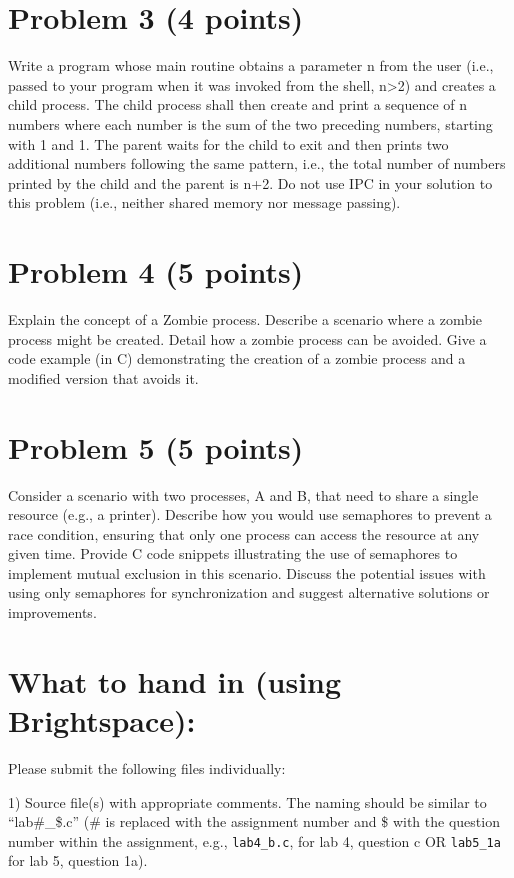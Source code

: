 \documentclass{article}
\begin{document}
\section*{Problem 3 (4 points)}

Write a program whose main routine obtains a parameter n from the user (i.e., passed to your program when it was invoked from the shell, n>2) and creates a child process. The child process shall then create and print a sequence of n numbers where each number is the sum of the two preceding numbers, starting with 1 and 1. The parent waits for the child to exit and then prints two additional numbers following the same pattern, i.e., the total number of numbers printed by the child and the parent is n+2. Do not use IPC in your solution to this problem (i.e., neither shared memory nor message passing).


\section*{Problem 4 (5 points)}

Explain the concept of a Zombie process. Describe a scenario where a zombie process might be created.  Detail how a zombie process can be avoided.  Give a code example (in C) demonstrating the creation of a zombie process and a modified version that avoids it.


\section*{Problem 5 (5 points)}

Consider a scenario with two processes, A and B, that need to share a single resource (e.g., a printer).  Describe how you would use semaphores to prevent a race condition, ensuring that only one process can access the resource at any given time. Provide C code snippets illustrating the use of semaphores to implement mutual exclusion in this scenario.  Discuss the potential issues with using only semaphores for synchronization and suggest alternative solutions or improvements.


\section*{What to hand in (using Brightspace):}

Please submit the following files individually:

1) Source file(s) with appropriate comments. The naming should be similar to “lab\#\_\$.c” (\# is replaced with the assignment number and \$ with the question number within the assignment, e.g., \texttt{lab4\_b.c}, for lab 4, question c OR \texttt{lab5\_1a} for lab 5, question 1a).
\end{document}
